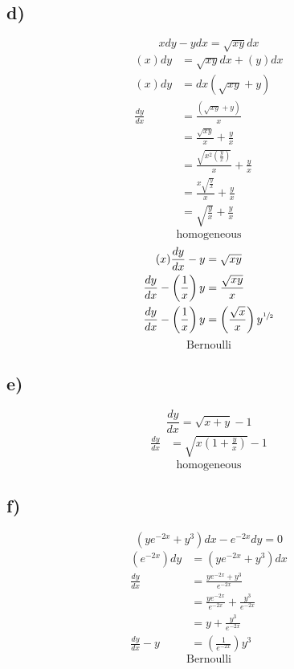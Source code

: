 \documentclass{article}
\begin{document}
\subsection{d)}
$$ xdy - ydx = \sqrt{xy}dx $$
\begin{align*}
	(x)dy & = \sqrt{xy}dx + (y)dx \\
	(x)dy & = dx \left( \sqrt{xy} + y \right) \\
	\frac{dy}{dx} & = \frac{\left( \sqrt{xy} + y \right)}{x} \\
				  & = \frac{\sqrt{xy}}{x} + \frac{y}{x} \\
				  & = \frac{\sqrt{x^2(\frac{y}{x})}}{x} + \frac{y}{x} \\
				  & = \frac{x\sqrt{\frac{y}{x}}}{x} + \frac{y}{x} \\
				  & = \sqrt{\frac{y}{x}} + \frac{y}{x}
\end{align*}
\begin{equation*}
	\boxed{\text{homogeneous}}
\end{equation*}
\begin{align*}
	(x)\frac{dy}{dx} - y & = \sqrt{xy} \\
	\frac{dy}{dx} - \left( \frac{1}{x} \right) y & = \frac{\sqrt{xy}}{x} \\
	\frac{dy}{dx} - \left( \frac{1}{x} \right) y & = \left( \frac{\sqrt{x}}{x} \right) y^{\sfrac{1}{2}}
\end{align*}
\begin{equation*}
	\boxed{\text{Bernoulli}}
\end{equation*}

\subsection{e)}
$$ \frac{dy}{dx} = \sqrt{x + y} - 1 $$
\begin{align*}
	\frac{dy}{dx} & = \sqrt{x(1 + \frac{y}{x})} - 1
\end{align*}
\begin{equation*}
	\boxed{\text{homogeneous}}
\end{equation*}

\subsection{f)}
$$ \left( ye^{-2x} + y^3 \right)dx - e^{-2x}dy = 0 $$
\begin{align*}
	\left( e^{-2x} \right)dy & = \left( ye^{-2x} + y^3 \right)dx \\
	\frac{dy}{dx} & = \frac{ye^{-2x} + y^3}{e^{-2x}} \\
				  & = \frac{ye^{-2x}}{e^{-2x}} + \frac{y^3}{e^{-2x}} \\
				  & = y + \frac{y^3}{e^{-2x}} \\
	\frac{dy}{dx} - y & = \left( \frac{1}{e^{-2x}} \right) y^3
\end{align*}
\begin{equation*}
	\boxed{\text{Bernoulli}}
\end{equation*}
\end{document}
